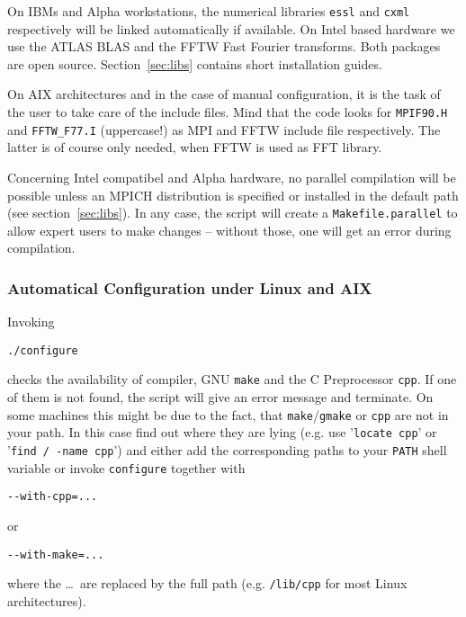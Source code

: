\documentclass[a4paper,10pt]{article}
\begin{document}
On IBMs and Alpha workstations, the numerical libraries \texttt{essl} and
\texttt{cxml} respectively will be linked automatically if available.  On Intel
based hardware we use the \mbox{ATLAS} \mbox{BLAS} and the \mbox{FFTW} Fast Fourier
transforms. Both packages are open source.  Section~\ref{sec:libs} contains
short installation guides.

On AIX architectures and in the case of manual configuration, it is the task of the user to take
care of the include files.  Mind that the code looks for \texttt{MPIF90.H} and
\texttt{FFTW\_F77.I} (uppercase!) as MPI and FFTW include file respectively.  The latter is
of course only needed, when FFTW is used as FFT library.

Concerning Intel compatibel and Alpha hardware, no parallel compilation will be possible
unless an MPICH distribution is specified or installed in the default path (see
section~\ref{sec:libs}).  In any case, the script will create a \texttt{Makefile.parallel}
to allow expert users to make changes -- without those, one will get an error during compilation.


\subsubsection*{Automatical Configuration under Linux and AIX}
Invoking
\begin{verbatim}
./configure
\end{verbatim}
checks the availability of compiler, GNU \texttt{make} and the C Preprocessor \texttt{cpp}.  If one
of them is not found, the script will give an error message and terminate.  On
some machines this might be due to the fact, that \texttt{make}/\texttt{gmake} or \texttt{cpp} are not in
your path.  In this case find out where they are lying (e.g. use '\texttt{locate cpp}' or '\texttt{find / -name cpp}') and either add the
corresponding paths to your \texttt{PATH} shell variable or invoke \texttt{configure} together with
\begin{verbatim}
--with-cpp=...
\end{verbatim}
or
\begin{verbatim}
--with-make=...
\end{verbatim}
where the \ldots\ are replaced by the full path (e.g. \texttt{/lib/cpp} for most Linux architectures).  
\end{document}
